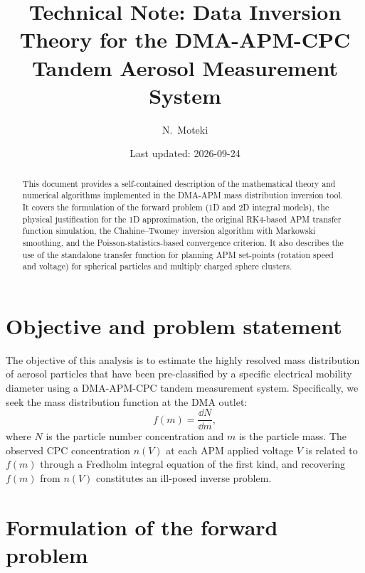 \documentclass[11pt,a4paper]{article}
\title{Technical Note: Data Inversion Theory for the DMA-APM-CPC\\
Tandem Aerosol Measurement System}
\author{N.~Moteki}
\date{Last updated: 2026-09-24}
\begin{document}
\maketitle

\begin{abstract}
This document provides a self-contained description of the mathematical
theory and numerical algorithms implemented in the DMA-APM mass distribution
inversion tool.  It covers the formulation of the forward problem (1D and 2D
integral models), the physical justification for the 1D approximation, the
original RK4-based APM transfer function simulation, the Chahine--Twomey
inversion algorithm with Markowski smoothing, and the Poisson-statistics-based
convergence criterion.  It also describes the use of the standalone transfer
function for planning APM set-points (rotation speed and voltage) for
spherical particles and multiply charged sphere clusters.
\end{abstract}

\tableofcontents
\newpage

\section{Objective and problem statement}
\label{sec:objective}

The objective of this analysis is to estimate the highly resolved mass
distribution of aerosol particles that have been pre-classified by a specific
electrical mobility diameter using a DMA-APM-CPC tandem measurement system.
Specifically, we seek the mass distribution function at the DMA outlet:
\begin{equation}
  f(m) = \frac{\dd N}{\dd m},
  \label{eq:mass-distribution}
\end{equation}
where $N$ is the particle number concentration and $m$ is the particle mass.
The observed CPC concentration $n(V)$ at each APM applied voltage $V$ is
related to $f(m)$ through a Fredholm integral equation of the first kind, and
recovering $f(m)$ from $n(V)$ constitutes an ill-posed inverse problem.

\section{Formulation of the forward problem}
\label{sec:forward-problem}
\end{document}
